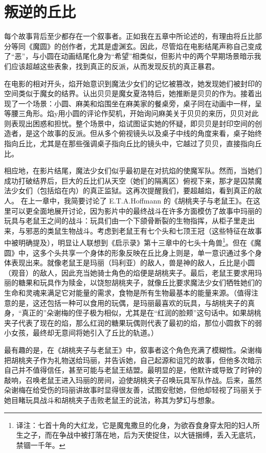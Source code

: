 \chapter{叛逆的丘比}
每个故事背后至少都存在一个叙事者。正如我在五章中所论述的，有理由将丘比部分等同《魔圆》的创作者，尤其是虚渊玄。因此，尽管焰在电影结尾声称自己变成了“恶”，与小圆在动画结尾化身为“希望”相类似，但影片中的两个早期场景暗示我们应该超越这些表象，找到真正的反派，从而发现反抗的真正暴君。

在电影的相对开头，焰开始意识到魔法少女们的记忆被篡改，她发现她们被封印的空间类似于魔女的结界。认出贝贝是魔女夏洛特后，她推断是贝贝的作为。接着出现了一个场景：小圆、麻美和焰围坐在麻美家的餐桌旁，桌子同在动画中一样，呈等腰三角形。焰y用小圆的评论作契机，开始询问麻美关于贝贝的来历，贝贝对此则表现出困惑和担忧。整个场景中，焰试图证实她的怀疑，即贝贝是封印空间的创造者，是这个故事的反派。但从多个俯视镜头以及桌子中线的角度来看，桌子始终指向丘比，尤其是在那些强调桌子指向丘比的镜头中，它越过了贝贝，直接指向丘比。

相应地，在影片结尾，魔法少女们似乎最初是在对抗焰的使魔军队。然而，当她们成功打破结界后，巨大的丘比们从天空（她们的隔离区）俯视下来，那才是囚禁魔法少女们（包括焰在内）的真正监狱。这再次提醒我们，要超越焰，看到真正的敌人。
在上一章中，我简要讨论了 E.T.A.Hoffmann 的《胡桃夹子与老鼠王》。在这里可以更全面地展开讨论，因为影片中的最终战斗在许多方面模仿了故事中玛丽的玩具与老鼠王之间的战斗：玩具们由一个下颌骨断裂的生物指挥，从柜子里走出来，与邪恶的类鼠生物战斗。考虑到老鼠王有七个头和七顶王冠（这些特征在故事中被明确提及），明显让人联想到《启示录》第十三章中的七头十角兽\footnote{译注：七首十角的大红龙，它是魔鬼撒旦的化身，为欲吞食身穿太阳的妇人所生之子，而在争战中被打落在地，后为天使捉住，以大链捆缚，丢入无底坑，禁锢一千年。}。但在《魔圆》中，这多个头共享一个身体的形象反映在丘比身上则是，单一意识通过多个身体表现出来。就像老鼠王是玛丽（玛利亚）的敌人，兽是神的敌人，丘比是小圆（观音）的敌人，因此充当她骑士角色的焰便是胡桃夹子。最后，老鼠王要求用玛丽的糖果和玩具作为赎金，以饶恕胡桃夹子，就像丘比要求魔法少女们牺牲她们的生命和灵魂来满足它对能量的需求，食物是所有生物最基本的能量来源。（值得注意的是，这还包括一种可以食用的玩偶，是玛丽最喜欢的玩具，与胡桃夹子的真身，“真正的”朵谢梅的侄子极为相似，尤其是在“红润的脸颊”这句话中。如果胡桃夹子代表了现在的焰，那么红润的糖果玩偶则代表了最初的焰，那位小圆救下的弱小女孩，最终却无意间将她引入了丘比的轨道。）

最有趣的是，在《胡桃夹子与老鼠王》中，叙事者这个角色充满了模糊性。朵谢梅把胡桃夹子作为礼物送给玛丽，并告诉她，自己起源和诅咒的故事，但他多次暗示自己并不值得信任，甚至可能与老鼠王结盟。最明显的是，他默许或导致了时钟的敲响，召唤老鼠王进入玛丽的房间，迫使胡桃夹子召唤玩具军队作战。后来，虽然朵谢梅在给受伤的玛丽讲故事时显得很友善，试图安慰她，但他却轻视了玛丽关于她目睹玩具战斗和胡桃夹子击败老鼠王的说法，称其为梦幻与想象。

